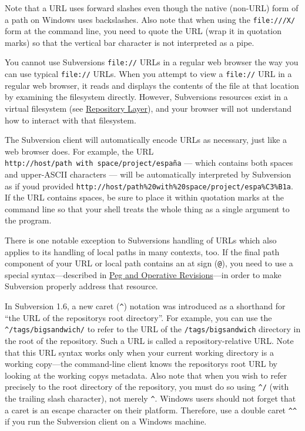 Note that a URL uses forward slashes even though the native (non-URL)
form of a path on Windows uses backslashes. Also note that when using
the \texttt{file:///X\textbar{}/} form at the command line, you need to
quote the URL (wrap it in quotation marks) so that the vertical bar
character is not interpreted as a pipe.

You cannot use Subversion\textquotesingle s \texttt{file://} URLs in a
regular web browser the way you can use typical \texttt{file://} URLs.
When you attempt to view a \texttt{file://} URL in a regular web
browser, it reads and displays the contents of the file at that location
by examining the filesystem directly. However,
Subversion\textquotesingle s resources exist in a virtual filesystem
(see \hyperref[svn.developer.layerlib.repos]{Repository Layer}), and
your browser will not understand how to interact with that filesystem.

The Subversion client will automatically encode URLs as necessary, just
like a web browser does. For example, the URL
\texttt{http://host/path\ with\ space/project/españa} --- which contains
both spaces and upper-ASCII characters --- will be automatically
interpreted by Subversion as if you\textquotesingle d provided
\texttt{http://host/path\%20with\%20space/project/espa\%C3\%B1a}. If the
URL contains spaces, be sure to place it within quotation marks at the
command line so that your shell treats the whole thing as a single
argument to the program.

There is one notable exception to Subversion\textquotesingle s handling
of URLs which also applies to its handling of local paths in many
contexts, too. If the final path component of your URL or local path
contains an at sign (\texttt{@}), you need to use a special
syntax---described in \hyperref[svn.advanced.pegrevs]{Peg and Operative
Revisions}---in order to make Subversion properly address that resource.

In Subversion 1.6, a new caret (\texttt{\^{}}) notation was introduced
as a shorthand for ``the URL of the repository\textquotesingle s root
directory''. For example, you can use the
\texttt{\^{}/tags/bigsandwich/} to refer to the URL of the
\texttt{/tags/bigsandwich} directory in the root of the repository. Such
a URL is called a repository-relative URL. Note that this URL syntax
works only when your current working directory is a working copy---the
command-line client knows the repository\textquotesingle s root URL by
looking at the working copy\textquotesingle s metadata. Also note that
when you wish to refer precisely to the root directory of the
repository, you must do so using \texttt{\^{}/} (with the trailing slash
character), not merely \texttt{\^{}}. Windows users should not forget
that a caret is an escape character on their platform. Therefore, use a
double caret \texttt{\^{}\^{}} if you run the Subversion client on a
Windows machine.

